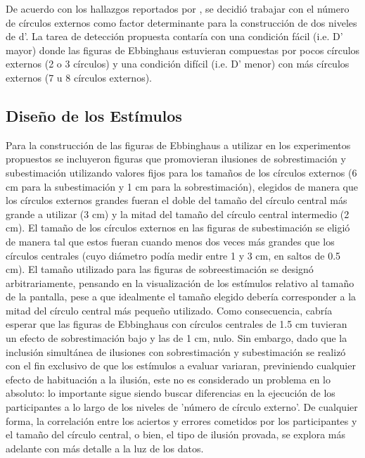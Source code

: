 De acuerdo con los hallazgos reportados por \parencite{Massaro1971}, se decidió trabajar con el número de círculos externos como factor determinante para la construcción de dos niveles de d'. La tarea de detección propuesta contaría con una condición fácil (i.e. D' mayor) donde las figuras de Ebbinghaus estuvieran compuestas por pocos círculos externos (2 o 3 círculos) y una condición difícil (i.e. D' menor) con más círculos externos (7 u 8 círculos externos).\\ 

\subsection{Diseño de los Estímulos}

Para la construcción de las figuras de Ebbinghaus a utilizar en los experimentos propuestos se incluyeron figuras que promovieran ilusiones de sobrestimación y subestimación utilizando valores fijos para los tamaños de los círculos externos (6 cm para la subestimación y 1 cm para la sobrestimación), elegidos de manera que los círculos externos grandes fueran el doble del tamaño del círculo central más grande a utilizar (3 cm) y la mitad del tamaño del círculo central intermedio (2 cm). El tamaño de los círculos externos en las figuras de subestimación se eligió de manera tal que estos fueran cuando menos dos veces más grandes que los círculos centrales (cuyo diámetro podía medir entre 1 y 3 cm, en saltos de 0.5 cm). El tamaño utilizado para las figuras de sobreestimación se designó arbitrariamente, pensando en la visualización de los estímulos relativo al tamaño de la pantalla, pese a que idealmente el tamaño elegido debería corresponder a la mitad del círculo central más pequeño utilizado. Como consecuencia, cabría esperar que las figuras de Ebbinghaus con círculos centrales de 1.5 cm tuvieran un efecto de sobrestimación bajo y las de 1 cm, nulo. Sin embargo, dado que la inclusión simultánea de ilusiones con sobrestimación y subestimación se realizó con el fin exclusivo de que los estímulos a evaluar variaran, previniendo cualquier efecto de habituación a la ilusión, este no es considerado un problema en lo absoluto: lo importante sigue siendo buscar diferencias en la ejecución de los participantes a lo largo de los niveles de 'número de círculo externo'. De cualquier forma, la correlación entre los aciertos y errores cometidos por los participantes y el tamaño del círculo central, o bien, el tipo de ilusión provada, se explora más adelante con más detalle a la luz de los datos.\\

